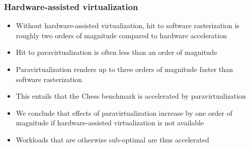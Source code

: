 \begin{frame}
\frametitle{Hardware-assisted virtualization}

\begin{itemize}
	\item Without hardware-assisted virtualization, hit to software rasterization is roughly two orders of magnitude compared to hardware acceleration
	\item Hit to paravirtualization is often less than an order of magnitude
	\item Paravirtualization renders up to three orders of magnitude faster than software rasterization
        \item This entails that the Chess benchmark is accelerated by paravirtualization
        \item We conclude that effects of paravirtualization increase by one order of magnitude if hardware-assisted virtualization is not available
        \item Workloads that are otherwise sub-optimal are thus accelerated
\end{itemize}

\end{frame}
